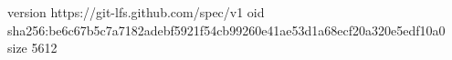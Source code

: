 version https://git-lfs.github.com/spec/v1
oid sha256:be6c67b5c7a7182adebf5921f54cb99260e41ae53d1a68ecf20a320e5edf10a0
size 5612
